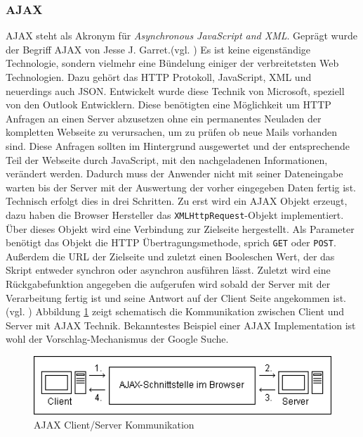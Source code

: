 \subsubsection{AJAX}
AJAX steht als Akronym für \textit{Asynchronous JavaScript and XML}. Geprägt wurde der Begriff AJAX von Jesse J. Garret.(vgl. \cite{JesseJGarret}) Es ist keine eigenständige Technologie, sondern vielmehr eine Bündelung einiger der verbreitetsten Web Technologien. Dazu gehört das HTTP Protokoll, JavaScript, XML und neuerdings auch JSON. Entwickelt wurde diese Technik von Microsoft, speziell von den Outlook Entwicklern. Diese benötigten eine Möglichkeit um HTTP Anfragen an einen Server abzusetzen ohne ein permanentes Neuladen der kompletten Webseite zu verursachen, um zu prüfen ob neue Mails vorhanden sind. Diese Anfragen sollten im Hintergrund ausgewertet und der entsprechende Teil der Webseite durch JavaScript, mit den nachgeladenen Informationen, verändert werden. Dadurch muss der Anwender nicht mit seiner Dateneingabe warten bis der Server mit der Auswertung der vorher eingegeben Daten fertig ist.\\Technisch erfolgt dies in drei Schritten. Zu erst wird ein AJAX Objekt erzeugt, dazu haben die Browser Hersteller das \texttt{XMLHttpRequest}-Objekt implementiert. Über dieses Objekt wird eine Verbindung zur Zielseite hergestellt. Als Parameter benötigt das Objekt die HTTP Übertragungsmethode, sprich \texttt{GET} oder \texttt{POST}. Außerdem die URL der Zielseite und zuletzt einen Booleschen Wert, der das Skript entweder synchron oder asynchron ausführen lässt. Zuletzt wird eine Rückgabefunktion angegeben die aufgerufen wird sobald der Server mit der Verarbeitung fertig ist und seine Antwort auf der Client Seite angekommen ist.(vgl. \cite[S.392ff]{WenzJava2008}) Abbildung \ref{fig:ajax} zeigt schematisch die Kommunikation zwischen Client und Server mit AJAX Technik. Bekanntestes Beispiel einer AJAX Implementation ist wohl der Vorschlag-Mechanismus der Google Suche.

\vspace{1em}
\begin{figure}[htb]
  \centering
  \includegraphics[width=1\textwidth]{abb/ajax_uml}
  \caption[AJAX Client/Server Kommunikation]{AJAX Client/Server Kommunikation \cite{ajax}}
  \label{fig:ajax}
\end{figure}


